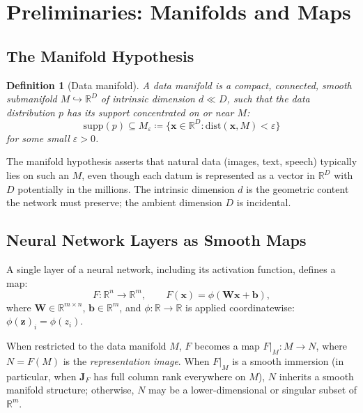 \documentclass[11pt,a4paper]{article}
\newtheorem{definition}[theorem]{Definition}
\theoremstyle{remark}
\begin{document}
\section{Preliminaries: Manifolds and Maps}
\label{sec:prelim}

\subsection{The Manifold Hypothesis}

\begin{definition}[Data manifold]
\label{def:data-manifold}
A \emph{data manifold} is a compact, connected, smooth submanifold $M \hookrightarrow \mathbb{R}^D$ of intrinsic dimension $d \ll D$, such that the data distribution $p$ has its support concentrated on or near $M$:
\[
  \mathrm{supp}(p) \subseteq M_\varepsilon \coloneqq \{\mathbf{x} \in \mathbb{R}^D : \mathrm{dist}(\mathbf{x}, M) < \varepsilon\}
\]
for some small $\varepsilon > 0$.
\end{definition}

The manifold hypothesis asserts that natural data (images, text, speech) typically lies on such an $M$, even though each datum is represented as a vector in $\mathbb{R}^D$ with $D$ potentially in the millions.
The intrinsic dimension $d$ is the geometric content the network must preserve; the ambient dimension $D$ is incidental.

\subsection{Neural Network Layers as Smooth Maps}

A single layer of a neural network, including its activation function, defines a map:
\begin{equation}
  F: \mathbb{R}^n \to \mathbb{R}^m, \qquad F(\mathbf{x}) = \phi(\mathbf{W}\mathbf{x} + \mathbf{b}),
  \label{eq:layer}
\end{equation}
where $\mathbf{W} \in \mathbb{R}^{m \times n}$, $\mathbf{b} \in \mathbb{R}^m$, and $\phi: \mathbb{R} \to \mathbb{R}$ is applied coordinatewise:
$\phi(\mathbf{z})_i = \phi(z_i)$.

When restricted to the data manifold $M$, $F$ becomes a map $F|_M: M \to N$, where $N = F(M)$ is the \emph{representation image}.
When $F|_M$ is a smooth immersion (in particular, when $\mathbf{J}_F$ has full column rank everywhere on $M$), $N$ inherits a smooth manifold structure; otherwise, $N$ may be a lower-dimensional or singular subset of $\mathbb{R}^m$.
\end{document}
